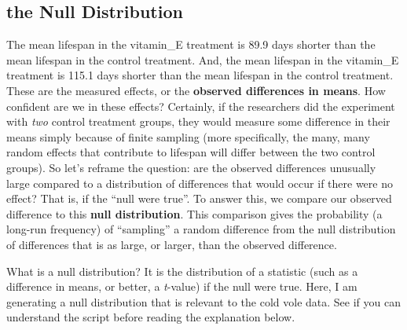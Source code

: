 \documentclass[]{book}
\begin{document}
\hypertarget{the-null-distribution}{%
\subsection{the Null Distribution}\label{the-null-distribution}}

The mean lifespan in the vitamin\_E treatment is 89.9 days shorter than the mean lifespan in the control treatment. And, the mean lifespan in the vitamin\_E treatment is 115.1 days shorter than the mean lifespan in the control treatment. These are the measured effects, or the \textbf{observed differences in means}. How confident are we in these effects? Certainly, if the researchers did the experiment with \emph{two} control treatment groups, they would measure some difference in their means simply because of finite sampling (more specifically, the many, many random effects that contribute to lifespan will differ between the two control groups). So let's reframe the question: are the observed differences unusually large compared to a distribution of differences that would occur if there were no effect? That is, if the ``null were true''. To answer this, we compare our observed difference to this \textbf{null distribution}. This comparison gives the probability (a long-run frequency) of ``sampling'' a random difference from the null distribution of differences that is as large, or larger, than the observed difference.

What is a null distribution? It is the distribution of a statistic (such as a difference in means, or better, a \emph{t}-value) if the null were true. Here, I am generating a null distribution that is relevant to the cold vole data. See if you can understand the script before reading the explanation below.
\end{document}
